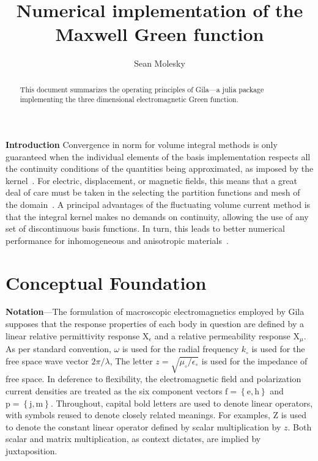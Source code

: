 \documentclass[reprint,aps,prb]{revtex4-2}
\newcommand{\bmm}[1]{\bm{\mathrm{#1}}}
\begin{document}
\title{Numerical implementation of the Maxwell Green function}
\author{Sean Molesky}
\begin{abstract}
\noindent
This document summarizes the operating principles of Gila---a julia package implementing the three dimensional electromagnetic Green function.
\end{abstract}
\maketitle
\noindent
\textbf{Introduction}
Convergence in norm for volume integral methods is only guaranteed when the individual elements of the basis implementation respects all the continuity conditions of the quantities being approximated, as imposed by the kernel~\cite{van2008well}. 
For electric, displacement, or magnetic fields, this means that a great deal of care must be taken in the selecting the partition functions and mesh of the domain~\cite{van2007gaps}. 
A principal advantages of the fluctuating volume current method is that the integral kernel makes no demands on continuity, allowing the use of any set of discontinuous basis functions. 
In turn, this leads to better numerical performance for inhomogeneous and anisotropic materials~\cite{markkanen2012discretization}. 
\section{Conceptual Foundation}
\noindent
\textbf{Notation}---The formulation of macroscopic electromagnetics employed by Gila supposes that the response properties of each body in question are defined by a linear relative permittivity response $\bmm{X}_{\epsilon}$ and a relative permeability response $\bmm{X}_{\mu}$. 
As per standard convention, $\omega$ is used for the radial frequency  $k_{\circ}$ is used for the free space wave vector $2\pi/\lambda$, 
The letter $z = \sqrt{\mu_{\circ}/\epsilon_{\circ}}$ is used for the impedance of free space. 
In deference to flexibility, the electromagnetic field and polarization current densities are treated as the six component vectors $\bmm{f}=\left\{\bmm{e},\bmm{h}\right\}$ and $\bmm{p} = \left\{\bmm{j},\bmm{m}\right\}$.  
Throughout, capital bold letters are used to denote linear operators, with symbols reused to denote closely related meanings. 
For examples, $\bmm{Z}$ is used to denote the constant linear operator defined by scalar multiplication by $z$. 
Both scalar and matrix multiplication, as context dictates, are implied by juxtaposition. 
\end{document}
